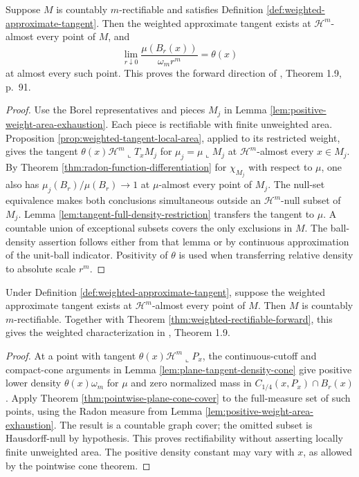 \begin{theorem}\label{thm:weighted-rectifiable-forward}
Suppose $M$ is countably $m$-rectifiable and satisfies Definition \ref{def:weighted-approximate-tangent}. Then the weighted approximate tangent exists at $\mathcal H^m$-almost every point of $M$, and
\[
 \lim_{r\downarrow0}\frac{\mu(B_r(x))}{\omega_mr^m}=\theta(x)
\]
at almost every such point. This proves the forward direction of \cite{Sim18}, Theorem 1.9, p.~91.
\end{theorem}
\begin{proof}
Use the Borel representatives and pieces $M_j$ in Lemma \ref{lem:positive-weight-area-exhaustion}. Each piece is rectifiable with finite unweighted area. Proposition \ref{prop:weighted-tangent-local-area}, applied to its restricted weight, gives the tangent $\theta(x)\mathcal H^m\llcorner T_xM_j$ for $\mu_j=\mu\llcorner M_j$ at $\mathcal H^m$-almost every $x\in M_j$. By Theorem \ref{thm:radon-function-differentiation} for $\chi_{M_j}$ with respect to $\mu$, one also has $\mu_j(B_r)/\mu(B_r)\to1$ at $\mu$-almost every point of $M_j$. The null-set equivalence makes both conclusions simultaneous outside an $\mathcal H^m$-null subset of $M_j$. Lemma \ref{lem:tangent-full-density-restriction} transfers the tangent to $\mu$. A countable union of exceptional subsets covers the only exclusions in $M$. The ball-density assertion follows either from that lemma or by continuous approximation of the unit-ball indicator. Positivity of $\theta$ is used when transferring relative density to absolute scale $r^m$.
\end{proof}

\begin{theorem}\label{thm:weighted-rectifiable-converse}
Under Definition \ref{def:weighted-approximate-tangent}, suppose the weighted approximate tangent exists at $\mathcal H^m$-almost every point of $M$. Then $M$ is countably $m$-rectifiable. Together with Theorem \ref{thm:weighted-rectifiable-forward}, this gives the weighted characterization in \cite{Sim18}, Theorem 1.9.
\end{theorem}
\begin{proof}
At a point with tangent $\theta(x)\mathcal H^m\llcorner P_x$, the continuous-cutoff and compact-cone arguments in Lemma \ref{lem:plane-tangent-density-cone} give positive lower density $\theta(x)\omega_m$ for $\mu$ and zero normalized mass in $C_{1/4}(x,P_x)\cap B_r(x)$. Apply Theorem \ref{thm:pointwise-plane-cone-cover} to the full-measure set of such points, using the Radon measure from Lemma \ref{lem:positive-weight-area-exhaustion}. The result is a countable graph cover; the omitted subset is Hausdorff-null by hypothesis. This proves rectifiability without asserting locally finite unweighted area. The positive density constant may vary with $x$, as allowed by the pointwise cone theorem.
\end{proof}

